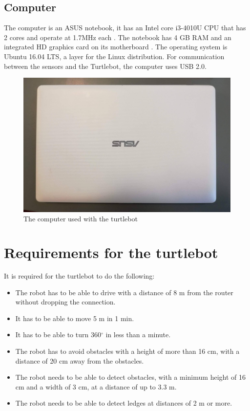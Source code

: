 \subsection{Computer} 
The computer is an ASUS notebook, it has an Intel core i3-4010U CPU that has 2 cores and operate at 1.7MHz each \cite{CPU}. The notebook has 4 GB RAM and an integrated HD graphics card on its motherboard \cite{ASUS}.
The operating system is Ubuntu 16.04 LTS, a layer for the Linux distribution. For communication between the sensors and the Turtlebot, the computer uses USB 2.0.
\begin{figure}[h]
   \centering
    \includegraphics[width=.8\textwidth]{figures/ASUS.jpg}
    \caption{The computer used with the turtlebot}
    \label{fig:ASUS}
\end{figure}

\section{Requirements for the turtlebot}\label{ch:Requirements for the turtlebot}
It is required for the turtlebot to do the following:
\begin{itemize}
    \item The robot has to be able to drive with a distance of 8 m from the router without dropping the connection.
    \item It has to be able to move 5 m in 1 min.
    \item It has to be able to turn 360${^\circ}$ in less than a minute.
    \item The robot has to avoid obstacles with a height of more than 16 cm, with a distance of 20 cm away from the obstacles. 
    \item The robot needs to be able to detect obstacles, with a minimum height of 16 cm and a width of 3 cm, at a distance of up to 3.3 m.
    \item The robot needs to be able to detect ledges at distances of 2 m or more.
\end{itemize} 

